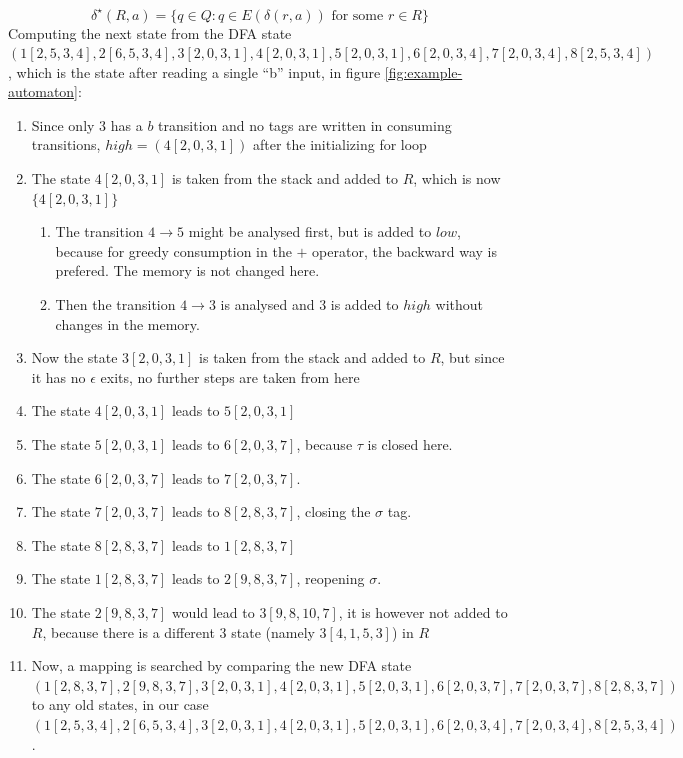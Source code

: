 \documentclass[english]{sigplanconf}
\begin{document}
\[
\delta^{\star}(R,a)=\{q\in Q:q\in E(\delta(r,a))\text{ for some }r\in R\}
\]
Computing the next state from the DFA state $(1[2,5,3,4],2[6,5,3,4],3[2,0,3,1],4[2,0,3,1],5[2,0,3,1],6[2,0,3,4],7[2,0,3,4],8[2,5,3,4])$,
which is the state after reading a single ``b'' input, in figure
\ref{fig:example-automaton}: 

\begin{enumerate}
\item Since only $3$ has a $b$ transition and no tags are written in consuming
transitions, $high=(4[2,0,3,1])$ after the initializing for loop
\item The state $4[2,0,3,1]$ is taken from the stack and added to $R$,
which is now $\{4[2,0,3,1]\}$ 

\begin{enumerate}
\item The transition $4\rightarrow5$ might be analysed first, but is added
to $low$, because for greedy consumption in the $+$ operator, the
backward way is prefered. The memory is not changed here.
\item Then the transition $4\rightarrow3$ is analysed and $3$ is added
to $high$ without changes in the memory.
\end{enumerate}
\item Now the state $3[2,0,3,1]$ is taken from the stack and added to $R$,
but since it has no $\epsilon$ exits, no further steps are taken
from here
\item The state $4[2,0,3,1]$ leads to $5[2,0,3,1]$
\item The state $5[2,0,3,1]$ leads to $6[2,0,3,7]$, because $\tau$ is
closed here.
\item The state $6[2,0,3,7]$ leads to $7[2,0,3,7]$.
\item The state $7[2,0,3,7]$ leads to $8[2,8,3,7]$, closing the $\sigma$
tag. 
\item The state $8[2,8,3,7]$ leads to $1[2,8,3,7]$
\item The state $1[2,8,3,7]$ leads to $2[9,8,3,7]$, reopening $\sigma$.
\item The state $2[9,8,3,7]$ would lead to $3[9,8,10,7]$, it is however
not added to $R$, because there is a different $3$ state (namely
$3[4,1,5,3]$) in $R$
\item Now, a mapping is searched by comparing the new DFA state $(1[2,8,3,7],2[9,8,3,7],3[2,0,3,1],4[2,0,3,1],5[2,0,3,1],6[2,0,3,7],7[2,0,3,7],8[2,8,3,7])$
to any old states, in our case $(1[2,5,3,4],2[6,5,3,4],3[2,0,3,1],4[2,0,3,1],5[2,0,3,1],6[2,0,3,4],7[2,0,3,4],8[2,5,3,4])$. 


\end{enumerate}
\end{document}
